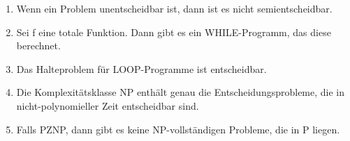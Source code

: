 \documentclass{lehramt-informatik-aufgabe}
\begin{document}
\begin{enumerate}

\item Wenn ein Problem unentscheidbar ist, dann ist es nicht
semientscheidbar.


\item Sei f eine totale Funktion. Dann gibt es ein WHILE-Programm, das
diese berechnet.

\item Das Halteproblem für LOOP-Programme ist entscheidbar.


\item Die Komplexitätsklasse NP enthält genau die Entscheidungsprobleme,
die in nicht-polynomieller Zeit entscheidbar sind.


\item Falls PZNP, dann gibt es keine NP-vollständigen Probleme, die in P
liegen.
\end{enumerate}
\end{document}
